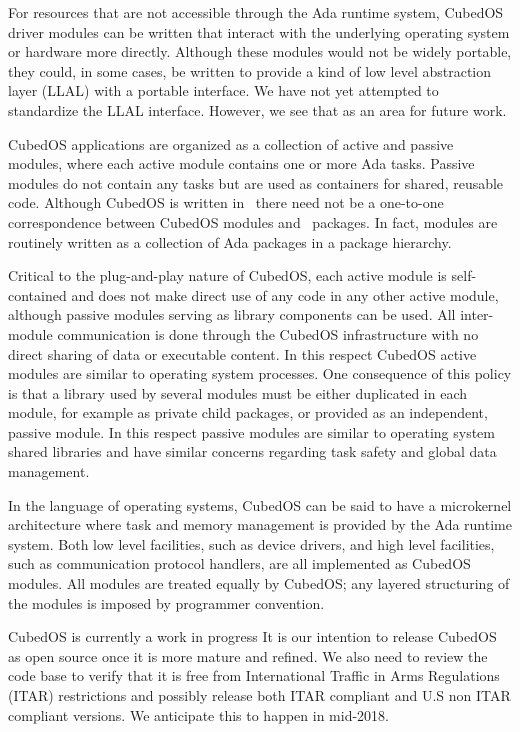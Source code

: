For resources that are not accessible through the Ada runtime system, CubedOS driver modules can
be written that interact with the underlying operating system or hardware more directly.
Although these modules would not be widely portable, they could, in some cases, be written to
provide a kind of low level abstraction layer (LLAL) with a portable interface. We have not yet
attempted to standardize the LLAL interface. However, we see that as an area for future work.

CubedOS applications are organized as a collection of active and passive modules, where each
active module contains one or more Ada tasks. Passive modules do not contain any tasks but are
used as containers for shared, reusable code. Although CubedOS is written in \SPARK\ there need
not be a one-to-one correspondence between CubedOS modules and \SPARK\ packages. In fact,
modules are routinely written as a collection of Ada packages in a package hierarchy.

Critical to the plug-and-play nature of CubedOS, each active module is self-contained and does
not make direct use of any code in any other active module, although passive modules serving as
library components can be used. All inter-module communication is done through the CubedOS
infrastructure with no direct sharing of data or executable content. In this respect CubedOS
active modules are similar to operating system processes. One consequence of this policy is that
a library used by several modules must be either duplicated in each module, for example as
private child packages, or provided as an independent, passive module. In this respect passive
modules are similar to operating system shared libraries and have similar concerns regarding
task safety and global data management.

In the language of operating systems, CubedOS can be said to have a microkernel architecture
where task and memory management is provided by the Ada runtime system. Both low level
facilities, such as device drivers, and high level facilities, such as communication protocol
handlers, are all implemented as CubedOS modules. All modules are treated equally by CubedOS;
any layered structuring of the modules is imposed by programmer convention.


CubedOS is currently a work in progress It is our intention to release CubedOS as open source
once it is more mature and refined. We also need to review the code base to verify that it is
free from International Traffic in Arms Regulations (ITAR) restrictions and possibly release both
 ITAR compliant and U.S non ITAR compliant versions. We anticipate this to happen in mid-2018.
